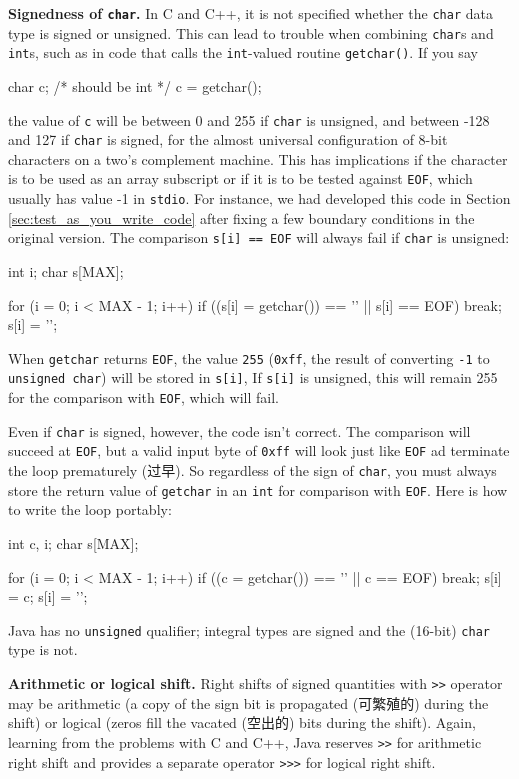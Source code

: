 \textbf{Signedness of \texttt{char}.} In C and C++, it is not specified
whether the \verb'char' data type is signed or unsigned. This can lead to
trouble when combining \verb'char's and \verb'int's, such as in code that
calls the \verb'int'-valued routine \verb'getchar()'. If you say
\begin{wellcode}
    char    c;  /* should be int */
    c = getchar();
\end{wellcode}
the value of \verb'c' will be between 0 and 255 if \verb'char' is unsigned,
and between -128 and 127 if \verb'char' is signed, for the almost universal
configuration of 8-bit characters on a two's complement machine. This has
implications if the character is to be used as an array subscript or if it
is to be tested against \verb'EOF', which usually has value -1 in
\verb'stdio'.  For instance, we had developed this code in Section
\ref{sec:test_as_you_write_code} after fixing a few boundary conditions in
the original version. The comparison \verb's[i] == EOF' will always fail if
\verb'char' is unsigned:
\begin{badcode}
    int i;
    char s[MAX];

    for (i = 0; i < MAX - 1; i++)
        if ((s[i] = getchar()) == '\n' || s[i] == EOF)
            break;
    s[i] = '\0';
\end{badcode}
When \verb'getchar' returns \verb'EOF', the value \verb'255' (\verb'0xff',
the result of converting \verb'-1' to \verb'unsigned char') will be stored
in \verb's[i]', If \verb's[i]' is unsigned, this will remain 255 for the
comparison with \verb'EOF', which will fail.

Even if \verb'char' is signed, however, the code isn't correct. The
comparison will succeed at \verb'EOF', but a valid input byte of
\verb'0xff' will look just like \verb'EOF' ad terminate the loop
prematurely (过早). So regardless of the sign of \verb'char', you must
always store the return value of \verb'getchar' in an \verb'int' for
comparison with \verb'EOF'. Here is how to write the loop portably:
\begin{wellcode}
    int c, i;
    char s[MAX];

    for (i = 0; i < MAX - 1; i++) {
        if ((c = getchar()) == '\n' || c == EOF)
            break;
        s[i] = c;
    }
    s[i] = '\0';
\end{wellcode}

Java has no \verb'unsigned' qualifier; integral types are signed and the
(16-bit) \verb'char' type is not.

\textbf{Arithmetic or logical shift.} Right shifts of signed quantities
with \verb'>>' operator may be arithmetic (a copy of the sign bit is
propagated (可繁殖的) during the shift) or logical (zeros fill the vacated
(空出的) bits during the shift). Again, learning from the problems with C
and C++, Java reserves \verb'>>' for arithmetic right shift and provides a
separate operator \verb'>>>' for logical right shift.

